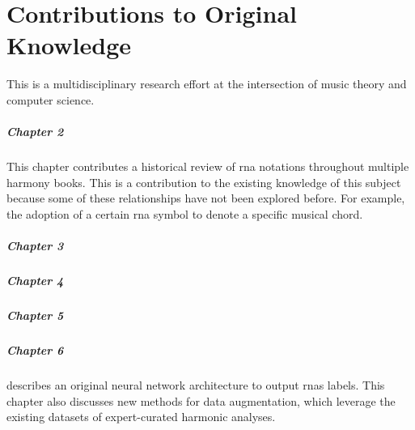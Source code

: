 \chapter*{Contributions to Original Knowledge}
\label{chap:contributionstoknowledge}

This \thesisdiss{} is a multidisciplinary research effort at
the intersection of music theory and computer science.

\paragraph{Chapter 2}

This chapter contributes a historical review of \gls{rna}
notations throughout multiple harmony books. This is a
contribution to the existing knowledge of this subject
because some of these relationships have not been explored
before. For example, the adoption of a certain \gls{rna}
symbol to denote a specific musical chord.

\paragraph{Chapter 3}
\paragraph{Chapter 4}
\paragraph{Chapter 5}
\paragraph{Chapter 6}




 describes an original neural network
architecture to output \glspl{rna} labels. This chapter also
discusses new methods for data augmentation, which leverage
the existing datasets of expert-curated harmonic analyses.

